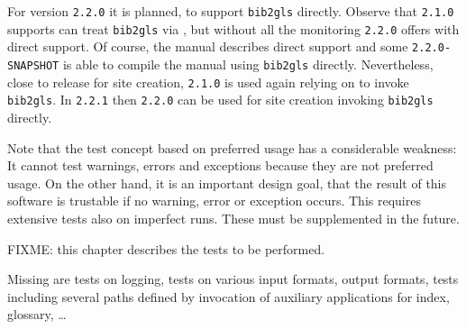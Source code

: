For version \texttt{2.2.0} it is planned, to support \texttt{bib2gls} directly. 
Observe that \texttt{2.1.0} supports can treat \texttt{bib2gls} via , 
but without all the monitoring \texttt{2.2.0} offers with direct support. 
Of course, the manual describes direct support and 
some \texttt{2.2.0-SNAPSHOT} is able to compile the manual using \texttt{bib2gls} directly. 
Nevertheless, close to release for site creation, 
\texttt{2.1.0} is used again relying on  to invoke \texttt{bib2gls}. 
In \texttt{2.2.1} then \texttt{2.2.0} can be used for site creation invoking \texttt{bib2gls} directly. 


Note that the test concept based on preferred usage has a considerable weakness: 
It cannot test warnings, errors and exceptions 
because they are not preferred usage. 
On the other hand, it is an important design goal, 
that the result of this software is trustable if no warning, error or exception occurs. 
This requires extensive tests also on imperfect runs. 
These must be supplemented in the future. 

FIXME\@: this chapter describes the tests to be performed. 

Missing are tests on logging, tests on various input formats, 
output formats, tests including several paths 
defined by invocation of auxiliary applications for index, glossary, \dots 

